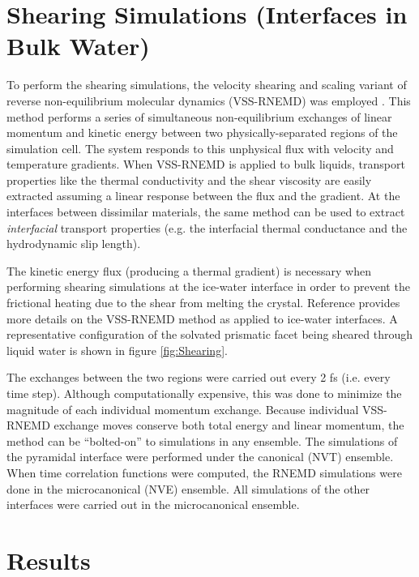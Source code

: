 \documentclass{pnastwo}
\begin{document}
\begin{article}
\section{Shearing Simulations (Interfaces in Bulk Water)}
To perform the shearing simulations, the velocity shearing and scaling
variant of reverse non-equilibrium molecular dynamics (VSS-RNEMD) was
employed \cite{Kuang12}. This method performs a series of simultaneous
non-equilibrium exchanges of linear momentum and kinetic energy
between two physically-separated regions of the simulation cell.  The
system responds to this unphysical flux with velocity and temperature
gradients.  When VSS-RNEMD is applied to bulk liquids, transport
properties like the thermal conductivity and the shear viscosity are
easily extracted assuming a linear response between the flux and the
gradient.  At the interfaces between dissimilar materials, the same
method can be used to extract \textit{interfacial} transport
properties (e.g. the interfacial thermal conductance and the
hydrodynamic slip length).

The kinetic energy flux (producing a thermal gradient) is necessary
when performing shearing simulations at the ice-water interface in
order to prevent the frictional heating due to the shear from melting
the crystal. Reference \citealp{Louden13} provides more details on the
VSS-RNEMD method as applied to ice-water interfaces.  A representative
configuration of the solvated prismatic facet being sheared through
liquid water is shown in figure \ref{fig:Shearing}.

The exchanges between the two regions were carried out every 2 fs
(i.e. every time step). Although computationally expensive, this was
done to minimize the magnitude of each individual momentum exchange.
Because individual VSS-RNEMD exchange moves conserve both total energy
and linear momentum, the method can be ``bolted-on'' to simulations in
any ensemble.  The simulations of the pyramidal interface were
performed under the canonical (NVT) ensemble.  When time correlation
functions were computed, the RNEMD simulations were done in the
microcanonical (NVE) ensemble.  All simulations of the other
interfaces were carried out in the microcanonical ensemble.

\section{Results}

\end{article}
\end{document}
